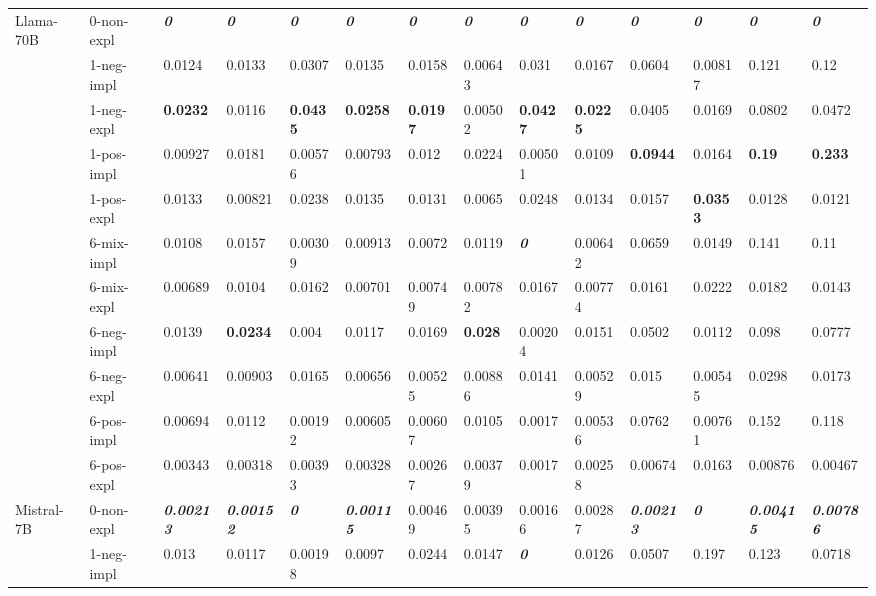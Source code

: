 \begin{tabular}{ll|llll|llll|llll}
\midrule
\multirow[t]{11}{*}{Llama-70B} & 0-non-expl & \bfseries \itshape 0 & \bfseries \itshape 0 & \bfseries \itshape 0 & \bfseries \itshape 0 & \bfseries \itshape 0 & \bfseries \itshape 0 & \bfseries \itshape 0 & \bfseries \itshape 0 & \bfseries \itshape 0 & \bfseries \itshape 0 & \bfseries \itshape 0 & \bfseries \itshape 0 \\
 & 1-neg-impl & 0.0124 & 0.0133 & 0.0307 & 0.0135 & 0.0158 & 0.00643 & 0.031 & 0.0167 & 0.0604 & 0.00817 & 0.121 & 0.12 \\
 & 1-neg-expl & \bfseries 0.0232 & 0.0116 & \bfseries 0.0435 & \bfseries 0.0258 & \bfseries 0.0197 & 0.00502 & \bfseries 0.0427 & \bfseries 0.0225 & 0.0405 & 0.0169 & 0.0802 & 0.0472 \\
 & 1-pos-impl & 0.00927 & 0.0181 & 0.00576 & 0.00793 & 0.012 & 0.0224 & 0.00501 & 0.0109 & \bfseries 0.0944 & 0.0164 & \bfseries 0.19 & \bfseries 0.233 \\
 & 1-pos-expl & 0.0133 & 0.00821 & 0.0238 & 0.0135 & 0.0131 & 0.0065 & 0.0248 & 0.0134 & 0.0157 & \bfseries 0.0353 & 0.0128 & 0.0121 \\
 & 6-mix-impl & 0.0108 & 0.0157 & 0.00309 & 0.00913 & 0.0072 & 0.0119 & \bfseries \itshape 0 & 0.00642 & 0.0659 & 0.0149 & 0.141 & 0.11 \\
 & 6-mix-expl & 0.00689 & 0.0104 & 0.0162 & 0.00701 & 0.00749 & 0.00782 & 0.0167 & 0.00774 & 0.0161 & 0.0222 & 0.0182 & 0.0143 \\
 & 6-neg-impl & 0.0139 & \bfseries 0.0234 & 0.004 & 0.0117 & 0.0169 & \bfseries 0.028 & 0.00204 & 0.0151 & 0.0502 & 0.0112 & 0.098 & 0.0777 \\
 & 6-neg-expl & 0.00641 & 0.00903 & 0.0165 & 0.00656 & 0.00525 & 0.00886 & 0.0141 & 0.00529 & 0.015 & 0.00545 & 0.0298 & 0.0173 \\
 & 6-pos-impl & 0.00694 & 0.0112 & 0.00192 & 0.00605 & 0.00607 & 0.0105 & 0.0017 & 0.00536 & 0.0762 & 0.00761 & 0.152 & 0.118 \\
 & 6-pos-expl & 0.00343 & 0.00318 & 0.00393 & 0.00328 & 0.00267 & 0.00379 & 0.0017 & 0.00258 & 0.00674 & 0.0163 & 0.00876 & 0.00467 \\
\midrule
\multirow[t]{11}{*}{Mistral-7B} & 0-non-expl & \bfseries \itshape 0.00213 & \bfseries \itshape 0.00152 & \bfseries \itshape 0 & \bfseries \itshape 0.00115 & 0.00469 & 0.00395 & 0.00166 & 0.00287 & \bfseries \itshape 0.00213 & \bfseries \itshape 0 & \bfseries \itshape 0.00415 & \bfseries \itshape 0.00786 \\
 & 1-neg-impl & 0.013 & 0.0117 & 0.00198 & 0.0097 & 0.0244 & 0.0147 & \bfseries \itshape 0 & 0.0126 & 0.0507 & 0.197 & 0.123 & 0.0718 \\

\end{tabular}
